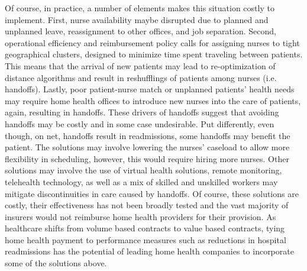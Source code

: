 \documentclass[final,12pt, notitlepage]{article}
\begin{document}
Of course, in practice, a number of elements makes this situation costly to implement. First, nurse availability maybe disrupted due to planned and unplanned leave, reassignment to other offices, and job separation. Second, operational efficiency and reimbursement policy calls for assigning nurses to tight geographical clusters, designed to minimize time spent traveling between patients. This means that the arrival of new patients may lead to re-optimization of distance algorithms and result in reshufflings of patients among nurses (i.e. handoffs). Lastly, poor patient-nurse match or unplanned patients' health needs may require home health offices to introduce new nurses into the care of patients, again, resulting in handoffs. These drivers of handoffs suggest that avoiding handoffs may be costly and in some case undesirable. Put differently, even though, on net, handoffs result in readmissions, some handoffs may benefit the patient. The solutions may involve lowering the nurses' caseload to allow more flexibility in scheduling, however, this would require hiring more nurses. Other solutions may involve the use of virtual health solutions, remote monitoring, telehealth technology, as well as a mix of skilled and unskilled workers may mitigate discontinuities in care caused by handoffs. Of course, these solutions are costly, their effectiveness has not been broadly tested and the vast majority of insurers would not reimburse home health providers for their provision. As healthcare shifts from volume based contracts to value based contracts, tying home health payment to performance measures such as reductions in hospital readmissions has the potential of leading home health companies to incorporate some of the solutions above.
\end{document}
